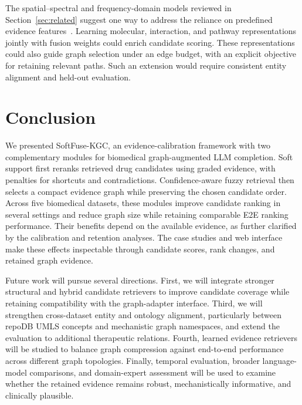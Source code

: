 \documentclass[pdflatex,sn-mathphys-num]{sn-jnl}
\newcommand{\softfuse}{SoftFuse-KGC}
\begin{document}
\begin{revisionblock}
The spatial--spectral and frequency-domain models reviewed in Section~\ref{sec:related} suggest one way to address the reliance on predefined evidence features~\citep{zhu2026spatialspectral,zhu2026fdmsgl}. Learning molecular, interaction, and pathway representations jointly with fusion weights could enrich candidate scoring. These representations could also guide graph selection under an edge budget, with an explicit objective for retaining relevant paths. Such an extension would require consistent entity alignment and held-out evaluation.
\end{revisionblock}


\section{Conclusion}
\label{sec:conclusion}


\begin{revisionblock}
We presented \softfuse{}, an evidence-calibration framework with two complementary modules for biomedical graph-augmented LLM completion. Soft support first reranks retrieved drug candidates using graded evidence, with penalties for shortcuts and contradictions. Confidence-aware fuzzy retrieval then selects a compact evidence graph while preserving the chosen candidate order. Across five biomedical datasets, these modules improve candidate ranking in several settings and reduce graph size while retaining comparable E2E ranking performance. Their benefits depend on the available evidence, as further clarified by the calibration and retention analyses. The case studies and web interface make these effects inspectable through candidate scores, rank changes, and retained graph evidence.
\end{revisionblock}


Future work will pursue several directions. First, we will integrate stronger structural and hybrid candidate retrievers to improve candidate coverage while retaining compatibility with the graph-adapter interface.  Third, we will strengthen cross-dataset entity and ontology alignment, particularly between repoDB UMLS concepts and mechanistic graph namespaces, and extend the evaluation to additional therapeutic relations. Fourth, learned evidence retrievers will be studied to balance graph compression against end-to-end performance across different graph topologies. Finally, temporal evaluation, broader language-model comparisons, and domain-expert assessment will be used to examine whether the retained evidence remains robust, mechanistically informative, and clinically plausible.
\end{document}
